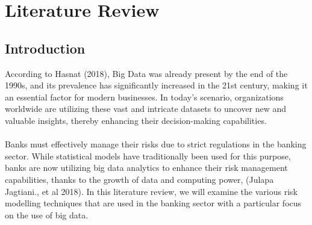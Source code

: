 
\chapter{Literature Review}

\section{Introduction}
According to Hasnat (2018), Big Data was already present by the end of the 1990s, and its prevalence
has significantly increased in the 21st century, making it an essential factor for modern businesses.
In today's scenario, organizations worldwide are utilizing these vast and intricate datasets to uncover
new and valuable insights, thereby enhancing their decision-making capabilities.\\\\
Banks must effectively manage their risks due to strict regulations in the banking sector.
While statistical models have traditionally been used for this purpose, banks are now utilizing big data
analytics to enhance their risk management capabilities, thanks to the growth of data and computing power,
(Julapa Jagtiani., et al 2018). In this literature review, we will examine the various risk modelling techniques
that are used in the banking sector with a particular focus on the use of big data.


